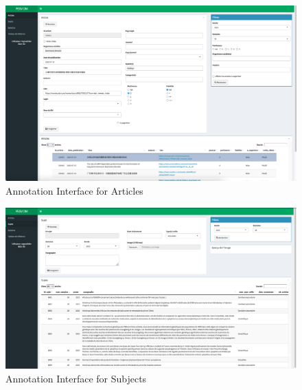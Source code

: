 \begin{landscape}
    \begin{figure}[ht]
        \centering
        \includegraphics[width=1.20\textwidth]{Figures/04/PESV_interface_1.png}
        \caption{\VSI{} Annotation Interface for Articles}
        \label{fig:04_pesv_interface_1}
    \end{figure}
\end{landscape}

\begin{landscape}
    \begin{figure}[ht]
        \centering
        \includegraphics[width=1.20\textwidth]{Figures/04/PESV_interface_2.png}
        \caption{\VSI{} Annotation Interface for Subjects}
        \label{fig:04_pesv_interface_2}
    \end{figure}
\end{landscape}




\label{vsi_data_statistics}

